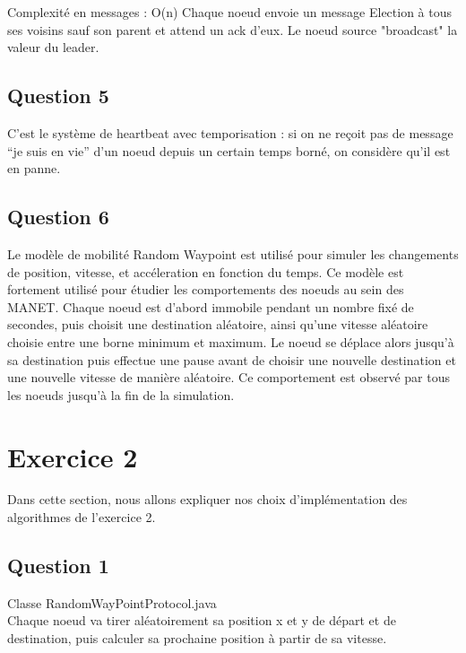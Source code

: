 \documentclass[paper=a4, fontsize=11pt]{article} %
\begin{document}
%
%
%			
%
%
%
%
Complexité en messages : O(n)
Chaque noeud envoie un message Election à tous ses voisins sauf son parent et attend un ack d'eux.
Le noeud source "broadcast" la valeur du leader.

 
\subsection{Question 5}
C'est le système de heartbeat avec temporisation : si on ne reçoit pas de message \enquote{je suis en vie} d'un noeud depuis un certain temps borné, on considère qu'il est en panne. 

\subsection{Question 6}

Le modèle de mobilité Random Waypoint est utilisé pour simuler les changements de position, vitesse, et accéleration en fonction du temps. Ce modèle est fortement utilisé
pour étudier les comportements des noeuds au sein des MANET. Chaque noeud est d'abord immobile pendant un nombre fixé de secondes, puis choisit une destination aléatoire, ainsi qu'une vitesse aléatoire choisie entre une borne
minimum et maximum. Le noeud se déplace alors jusqu'à sa destination puis effectue une pause avant de choisir une nouvelle destination et une nouvelle vitesse de manière aléatoire. Ce comportement est observé par tous les noeuds jusqu'à 
la fin de la simulation.

\newpage
\section{Exercice 2}
Dans cette section, nous allons expliquer nos choix d'implémentation des algorithmes de l'exercice 2.

\subsection{Question 1}
Classe RandomWayPointProtocol.java \\
Chaque noeud va tirer aléatoirement sa position x et y de départ et de destination, puis calculer sa prochaine position à partir de sa vitesse. 
\end{document}
